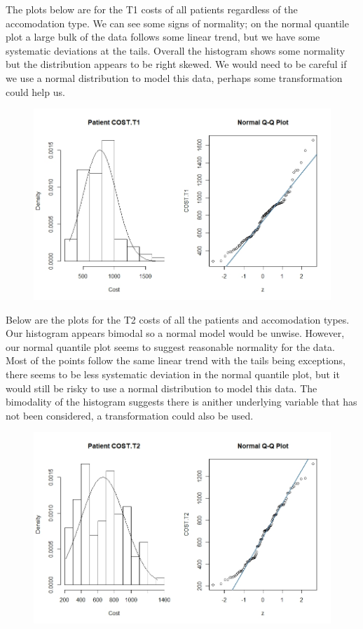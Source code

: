 \documentclass[]{article}
\begin{document}
\newpage
The plots below are for the T1 costs of all patients regardless of the accomodation type. We can see some signs of normality; on the normal quantile plot a large bulk of the data follows some linear trend, but we have some systematic deviations at the tails. Overall the histogram shows some normality but the distribution appears to be right skewed. We would need to be careful if we use a normal distribution to model this data, perhaps some transformation could help us.
\begin{figure}[H]
\centering
\includegraphics[width=12cm]{RStudio/jpeg/Norm_T1.jpeg}
\end{figure}
Below are the plots for the T2 costs of all the patients and accomodation types. Our histogram appears bimodal so a normal model would be unwise. However, our normal quantile plot seems to suggest reasonable normality for the data. Most of the points follow the same linear trend with the tails being exceptions, there seems to be less systematic deviation in the normal quantile plot, but it would still be risky to use a normal distribution to model this data. The bimodality of the histogram suggests there is anither underlying variable that has not been considered, a transformation could also be used.
\begin{figure}[H]
\centering
\includegraphics[width=12cm]{RStudio/jpeg/Norm_T2.jpeg}
\end{figure}
\newpage
\end{document}
